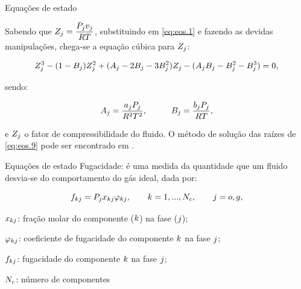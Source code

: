 \documentclass[professionalfont]{beamer}
\begin{document}
\begin{frame}{Equações de estado}

    Sabendo que $Z_{j} = \dfrac{P_{j} v_{j}}{R T}$, substituindo em \eqref{eq:eos.1} e fazendo as devidas manipulações, chega-se a equação cúbica para $Z_{j}$:

    \begin{equation}
        \label{eq:eos.8}
        Z_{j}^{3} - (1 - B_{j}) Z_{j}^{2} + (A_{j} - 2 B_{j} - 3 B_{j}^{2}) Z_{j} - (A_{j} B_{j} - B_{j}^{2} - B_{j}^{3}) = 0,
    \end{equation}

    sendo:

    \begin{equation}
        \label{eq:eos.9}
        A_{j} = \dfrac{a_{j} P_{j}}{R^{2} T^{2}}, \hspace{1cm} B_{j} = \dfrac{b_{j} P_{j}}{R T}, 
    \end{equation}

    e $Z_{j}$ o fator de compressibilidade do fluido. O método de solução das raízes de \eqref{eq:eos.9} pode ser encontrado em \cite{Chen2007,Chen2006,Soprano_2013}.

\end{frame}

\begin{frame}{Equações de estado}
    Fugacidade: é uma medida da quantidade que um fluido desvia-se do comportamento do gás ideal, dada por:

    \begin{equation}
        \label{eq:eos.11}
        f_{k j} = P_{j} x_{k j} \varphi_{k j}, \hspace{0.7cm} k=1,...,N_{c}, \hspace{0.7cm} j = o,g ,
    \end{equation}

    \begin{description}[]
        \item $x_{k j}$: fração molar do componente ($k$) na fase ($j$);
        \item  $\varphi_{k j}$: coeficiente de fugacidade do componente $k$ na fase $j$;
        \item $f_{k j}$: fugacidade do componente $k$ na fase $j$;
        \item $N_{c}$: número de componentes
    \end{description}
    
\end{frame}
\end{document}

